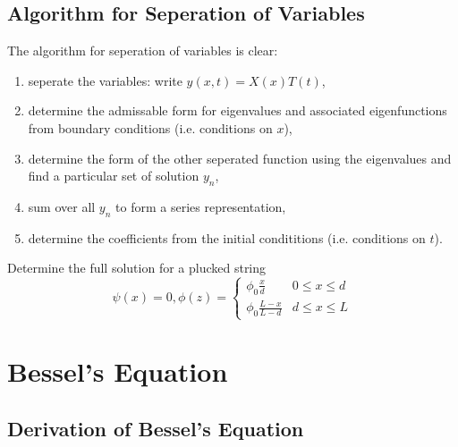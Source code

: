 \documentclass[a4paper]{article}
\begin{document}
\subsection{Algorithm for Seperation of Variables}

The algorithm for seperation of variables is clear:
\begin{enumerate}
\item seperate the variables: write \(y(x,t)=X(x)T(t)\),
\item determine the admissable form for eigenvalues and associated eigenfunctions from boundary conditions (i.e. conditions on \(x\)),
\item determine the form of the other seperated function using the eigenvalues and find a particular set of solution \(y_n\),
\item sum over all \(y_n\) to form a series representation,
\item determine the coefficients from the initial condititions (i.e. conditions on \(t\)).
\end{enumerate}

\begin{ex}
  Determine the full solution for a plucked string
  \[
    \psi(x) =0, \phi(z) =
    \begin{cases}
      \phi_0\frac{x}{d} & 0 \leq x \leq d \\
      \phi_0\frac{L-x}{L-d} & d \leq x \leq L
    \end{cases}
  \]
\end{ex}

\section{Bessel's Equation}

\subsection{Derivation of Bessel's Equation}

\label{subsec:derivation of Bessel}
\end{document}
